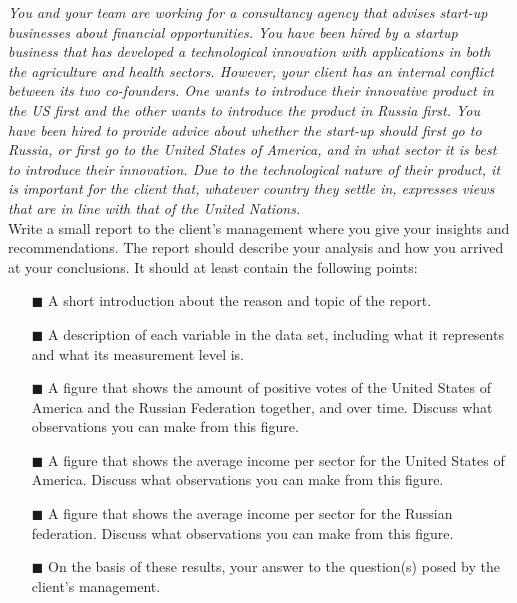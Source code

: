 \textit{You and your team are working for a consultancy agency that advises start-up businesses about financial opportunities. You have been hired by a startup business that has developed a technological innovation with applications in both the agriculture and health sectors. However, your client has an internal conflict between its two co-founders. One wants to introduce their innovative product in the US first and the other wants to introduce the product in Russia first. You have been hired to provide advice about whether the start-up should first go to Russia, or first go to the United States of America, and in what sector it is best to introduce their innovation. Due to the technological nature of their product, it is important for the client that, whatever country they settle in, expresses views that are in line with that of the United Nations.} \\

Write a small report to the client's management where you give your insights and recommendations. The report should describe your analysis and how you arrived at your conclusions. It should at least contain the following points: \\

\begin{itemize}
    \item[$\blacksquare$] A short introduction about the reason and topic of the report.
    \item[$\blacksquare$] A description of each variable in the  data set, including what it represents and what its measurement level is. 
    \item[$\blacksquare$] A figure that shows the amount of positive votes of the United States of America and the Russian Federation together, and over time.  Discuss what observations you can make from this figure.
    \item[$\blacksquare$] A figure that shows the average income per sector for the United States of America. Discuss what observations you can make from this figure.
    \item[$\blacksquare$] A figure that shows the average income per sector for the Russian federation. Discuss what observations you can make from this figure.
    \item[$\blacksquare$] On the basis of these results, your answer to the question(s) posed by the client's management.
\end{itemize}

\clearpage %